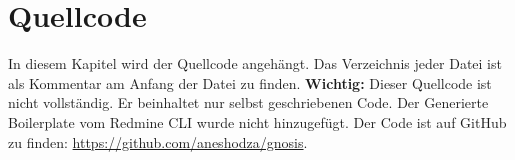 \chapter{Quellcode}
In diesem Kapitel wird der Quellcode angehängt. Das Verzeichnis jeder Datei ist als Kommentar am Anfang
der Datei zu finden. \newline
\textbf{Wichtig:} Dieser Quellcode ist nicht vollständig.
Er beinhaltet nur selbst geschriebenen Code. Der Generierte Boilerplate vom Redmine CLI wurde nicht
hinzugefügt. Der Code ist auf GitHub zu finden: \url{https://github.com/aneshodza/gnosis}.
